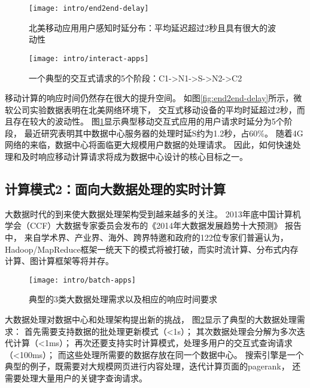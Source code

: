 \begin{figure}
\begin{minipage}{0.48\textwidth}
  \centering
  \texttt{[image: intro/end2end-delay]}
  \caption[北美移动应用用户感知时延分布]{北美移动应用用户感知时延分布：平均延迟超过2秒且具有很大的波动性}
  \label{fig:end2end-delay}
\end{minipage}\hfill
\begin{minipage}{0.48\textwidth}
  \centering
  \texttt{[image: intro/interact-apps]}
  \caption[一个典型的交互式请求的5个阶段]{一个典型的交互式请求的5个阶段：C1->N1->S->N2->C2 \cite{timecard:2013}}
  \label{fig:interact-apps}
\end{minipage}
\end{figure}

移动计算的响应时间仍然存在很大的提升空间。
如图\ref{fig:end2end-delay}所示，微软公司实验数据表明在北美网络环境下，
交互式移动设备的平均时延超过2秒，而且存在较大的波动性。
图\ref{fig:interact-apps}显示典型移动交互式应用的用户请求时延分为5个阶段，
最近研究\cite{timecard2013}表明其中数据中心服务器的处理时延S约为1.2秒，占60\%。
随着4G网络的来临，数据中心将面临更大规模用户数据的处理请求。
因此，如何快速处理和及时响应移动计算请求将成为数据中心设计的核心目标之一。


\subsection*{计算模式2：面向大数据处理的实时计算}

大数据时代的到来使大数据处理架构受到越来越多的关注。
2013年底中国计算机学会（CCF）大数据专家委员会发布的《2014年大数据发展趋势十大预测》 报告中，
来自学术界、产业界、海外、跨界特邀和政府的122位专家们普遍认为，
Hadoop/MapReduce框架一统天下的模式将被打破，而实时流计算、分布式内存计算、图计算框架等将并存。

\begin{figure}[H]
  \centering
  \texttt{[image: intro/batch-apps]}
  \caption{典型的3类大数据处理需求以及相应的响应时间要求}
  \label{fig:batch-apps}
\end{figure}


大数据处理对数据中心和处理架构提出新的挑战，
图\ref{fig:batch-apps}显示了典型的大数据处理需求：
首先需要支持数据的批处理更新模式（<1s）；
其次数据处理会分解为多次迭代计算（<1ms）；
再次还要支持实时计算模式，处理多用户的交互式查询请求（<100ms）；
而这些处理所需要的数据存放在同一个数据中心。
搜索引擎是一个典型的例子，既需要对大规模网页进行内容处理，迭代计算页面的pagerank，
还需要处理大量用户的关键字查询请求。

